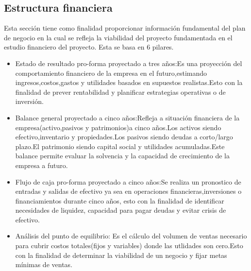 
\subsection{Estructura financiera}
Esta sección tiene como finalidad proporcionar información fundamental del plan de negocio en la cual se refleja la viabilidad del proyecto fundamentada en el estudio financiero del proyecto. Esta se basa en 6 pilares.
\begin{itemize}
    \item Estado de resultado pro-forma proyectado a tres años:Es una proyección del comportamiento financiero de la empresa en el futuro,estimando ingresos,costos,gastos y utilidades basados en supuestos realistas.Esto con la finalidad de prever rentabilidad y planificar estrategias operativas o de inversión.
    \item Balance general proyectado a cinco años:Refleja a situación financiera de la empresa(activo,pasivos y patrimonios)a cinco años.Los activos siendo efectivo,inventario y propiedades.Los pasivos siendo deudas a corto/largo plazo.El patrimonio siendo capital social y utilidades acumuladas.Este balance permite evaluar la solvencia y la capacidad de crecimiento de la empresa a futuro.
    \item Flujo de caja pro-forma proyectado a cinco años:Se realiza un pronostico de entradas y salidas de efectivo ya sea en operaciones financieras,inversiones o financiamientos durante cinco años, esto con la finalidad de identificar necesidades de liquidez, capacidad para pagar deudas y evitar crisis de efectivo.
    \item Análisis del punto de equilibrio: Es el cálculo del volumen de ventas necesario para cubrir costos totales(fijos y variables) donde las utlidades son cero.Esto con la finalidad de determinar la viabilidad de un negocio y fijar metas mínimas de ventas.
\end{itemize} 


